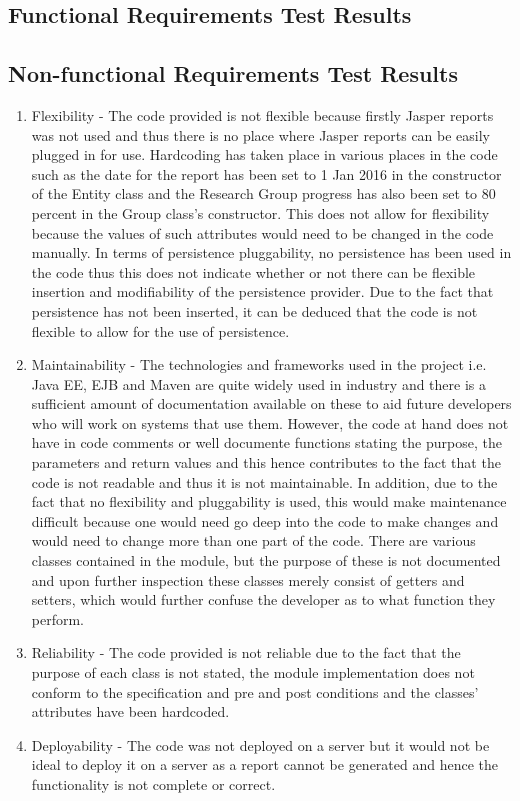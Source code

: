 \subsection{Functional Requirements Test Results}

\subsection{Non-functional Requirements Test Results}
\begin{enumerate} 
\item Flexibility - The code provided is not flexible because firstly Jasper reports was not used and thus there is no place where Jasper reports can be easily plugged in for use. Hardcoding has taken place in various places in the code such as the date for the report has been set to 1 Jan 2016 in the constructor of the Entity class and the Research Group progress has also been set to 80 percent in the Group class's constructor. This does not allow for flexibility because the values of such attributes would need to be changed in the code manually. In terms of persistence pluggability, no persistence has been used in the code thus this does not indicate whether or not there can be flexible insertion and modifiability of the persistence provider. Due to the fact that persistence has not been inserted, it can be deduced that the code is not flexible to allow for the use of persistence.
\item Maintainability - The technologies and frameworks used in the project i.e. Java EE, EJB and Maven are quite widely used in industry and there is a sufficient amount of documentation available on these to aid future developers who will work on systems that use them. However, the code at hand does not have in code comments or well documente functions stating the purpose, the parameters and return values and this hence contributes to the fact that the code is not readable and thus it is not maintainable. In addition, due to the fact that no flexibility and pluggability is used, this would make maintenance difficult because one would need go deep into the code to make changes and would need to change more than one part of the code. There are various classes contained in the module, but the purpose of these is not documented and upon further inspection these classes merely consist of getters and setters, which would further confuse the developer as to what function they perform. 
\item Reliability - The code provided is not reliable due to the fact that the purpose of each class is not stated, the module implementation does not conform to the specification and pre and post conditions and the classes' attributes have been hardcoded.
\item Deployability - The code was not deployed on a server but it would not be ideal to deploy it on a server as a report cannot be generated and hence the functionality is not complete or correct. 
\end{enumerate}
